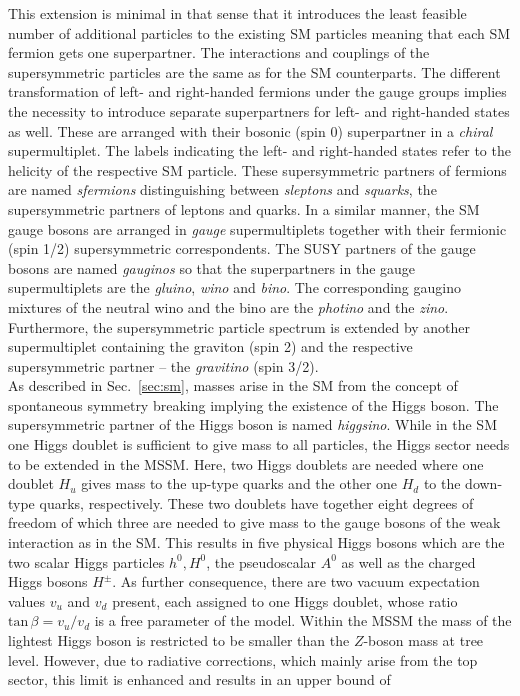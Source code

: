 This extension is minimal in that sense that it introduces the least feasible number of additional particles to the existing SM particles meaning that each SM fermion gets one superpartner. The interactions and couplings of the supersymmetric particles are the same as for the SM counterparts. The different transformation of left- and right-handed fermions under the gauge groups implies the necessity to introduce separate superpartners for left- and right-handed states as well. These are arranged with their bosonic (spin 0) superpartner in a \textit{chiral} supermultiplet. The labels indicating the left- and right-handed states refer to the helicity of the respective SM particle. These supersymmetric partners of fermions are named \textit{sfermions} distinguishing between \textit{sleptons} and \textit{squarks}, the supersymmetric partners of leptons and quarks. In a similar manner, the SM gauge bosons are arranged in \textit{gauge} supermultiplets together with their fermionic (spin 1/2) supersymmetric correspondents. The SUSY partners of the gauge bosons are named \textit{gauginos} so that the superpartners in the gauge supermultiplets are the \textit{gluino}, \textit{wino} and \textit{bino}. The corresponding gaugino mixtures of the neutral wino and the bino are the \textit{photino} and the \textit{zino}. Furthermore, the supersymmetric particle spectrum is extended by another supermultiplet containing the graviton (spin 2) and the respective supersymmetric partner -- the \textit{gravitino} (spin 3/2). \\
As described in Sec.~\ref{sec:sm}, masses arise in the SM from the concept of spontaneous symmetry breaking implying the existence of the Higgs boson. The supersymmetric partner of the Higgs boson is named \textit{higgsino}. While in the SM one Higgs doublet is sufficient to give mass to all particles, the Higgs sector needs to be extended in the MSSM. Here, two Higgs doublets are needed where one doublet $H_u$ gives mass to the up-type quarks and the other one $H_d$ to the down-type quarks, respectively. These two doublets have together eight degrees of freedom of which three are needed to give mass to the gauge bosons of the weak interaction as in the SM. This results in five physical Higgs bosons which are the two scalar Higgs particles $h^0, H^0$, the pseudoscalar $A^0$ as well as the charged Higgs bosons $H^{\pm}$. As further consequence, there are two vacuum expectation values $v_u$ and $v_d$ present, each assigned to one Higgs doublet, whose ratio $\mathrm{tan} \, \beta = v_u/v_d$ is a free parameter of the model. Within the MSSM the mass of the lightest Higgs boson is restricted to be smaller than the $Z$-boson mass at tree level. However, due to radiative corrections, which mainly arise from the top sector, this limit is enhanced and results in an upper bound of 

